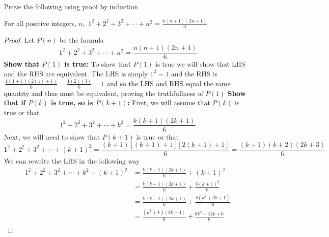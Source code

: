\documentclass[addpoints]{exam}
\begin{document}
  \vspace{1in}

  \noindent{}

  \vspace{.1in}

  \begin{center}
  \end{center}
  
  \begin{questions}
    \question Prove the following using proof by induction
    \begin{center}
      For all positive integers, $n$, $\displaystyle\,1^2 + 2^2 + 3^2 + \cdots + n^2 = \frac{n(n+1)(2n+1)}{6}$
    \end{center}
    \begin{solution}[\stretch{1}]
      \begin{proof}
        Let $P(n)$ be the formula \[\displaystyle\,1^2 + 2^2 + 3^2 + \cdots + n^2 = \frac{n(n+1)(2n+1)}{6}\]
        \textbf{Show that $P(1)$ is true:} To show that $P(1)$ is true we will show that LHS and the RHS are equivalent. The LHS is simply $1^2=1$ and the RHS is $\displaystyle\, \frac{1(1+1)(2(1)+1)}{6} = \frac{1(2)(3)}{6} = 1$ and so the LHS and RHS equal the same quantity and thus must be equivalent, proving the truthfullness of $P(1)$
        \newline\textbf{Show that if $P(k)$ is true, so is $P(k+1)$:} First, we will assume that $P(k)$ is true or that 
        \[
          1^2 + 2^2 + 3^2 + \cdots + k^2 = \frac{k(k+1)(2k+1)}{6}
        \]
        Next, we will need to show that $P(k+1)$ is true or that 
        \[
          1^2 + 2^2 + 3^2 + \cdots + (k+1)^2 = \frac{(k+1)\left[\left(k+1\right)+1\right]\left[2\left(k+1\right)+1\right]}{6} = \frac{(k+1)(k+2)(2k+3)}{6}
        \]
        We can rewrite the LHS in the following way 
        \begin{align*}
          1^2 + 2^2 + 3^2 + \cdots + k^2 + (k+1)^2 &= \frac{k(k+1)(2k+1)}{6} + (k+1)^2 \\ 
          &= \frac{k(k+1)(2k+1)}{6} + \frac{6(k+1)^2}{6} \\
          &= \frac{k(k+1)(2k+1)}{6} + \frac{6(k^2 + 2k + 1)}{6} \\ 
          &= \frac{(k^2+k)(2k+1)}{6} + \frac{6k^2 + 12k + 6}{6} \\ 

\end{align*}
\end{proof}
\end{solution}
\end{questions}
\end{document}
